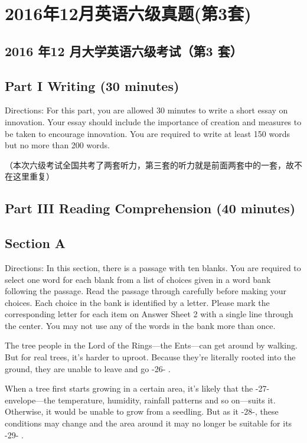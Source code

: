 \documentclass[UTF8,11pt]{ctexart}
\begin{document}
\section*{2016年12月英语六级真题(第3套)}
\subsection*{\textbf{2016 年12 月大学英语六级考试（第3 套）}}


\subsection*{\textbf{Part I} \textbf{Writing} \textbf{(30 minutes)}}


Directions: For this part, you are allowed 30 minutes to write a short essay on innovation. Your essay should include the importance of creation and measures to be taken to encourage innovation. You are required to write at least 150 words but no more than 200 words.


（本次六级考试全国共考了两套听力，第三套的听力就是前面两套中的一套，故不在这里重复）


\subsection*{\textbf{Part III} \textbf{Reading Comprehension} \textbf{(40 minutes)}}


\subsection*{\textbf{Section A}}


Directions: In this section, there is a passage with ten blanks. You are required to select one word for each blank from a list of choices given in a word bank following the passage. Read the passage through carefully before making your choices. Each choice in the bank is identified by a letter. Please mark the corresponding letter for each item on Answer Sheet 2 with a single line through the center. You may not use any of the words in the bank more than once.


The tree people in the Lord of the Rings—the Ents---can get around by walking. But for real trees, it’s harder to uproot. Because they’re literally rooted into the ground, they are unable to leave and go -26- .


When a tree first starts growing in a certain area, it’s likely that the -27- envelope—the temperature, humidity, rainfall patterns and so on—suits it. Otherwise, it would be unable to grow from a seedling. But as it -28-, these conditions may change and the area around it may no longer be suitable for its -29- .
\end{document}
